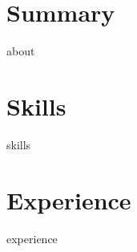 \documentclass[letterpaper,11pt]{article}
\begin{document}
\label{sec:header}

\vspace*{4pt}

\section{Summary}\label{sec:about}
\vspace*{4pt}
{about}
\vspace*{2pt}

\section{Skills}\label{sec:skills}
\vspace*{4pt}
{skills}
\vspace*{2pt}

\section{Experience}\label{sec:experience}
\vspace*{8pt}
{experience}
\end{document}
